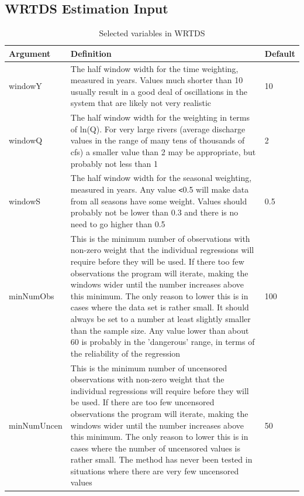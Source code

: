 \documentclass[a4paper,11pt]{article}\usepackage[]{graphicx}\usepackage[]{color}
\begin{document}
\subsection{WRTDS Estimation Input}
\label{sec:wrtdsInputVariables}
\begin{table}[ht]
\caption{Selected variables in WRTDS  \label{tab:WRTDS}}
\begin{tabularx}{\textwidth}{lXl}
\hline
  \textbf{Argument} & \textbf{Definition} & \textbf{Default} \\
\hline
windowY & The half window width for the time weighting, measured in years.  Values much shorter than 10 usually result in a good deal of oscillations in the system that are likely not very realistic & 10\\
windowQ & The half window width for the weighting in terms of ln(Q).  For very large rivers (average discharge values in the range of many tens of thousands of cfs) a smaller value than 2 may be appropriate, but probably not less than 1 & 2 \\
windowS & The half window width for the seasonal weighting, measured in years.  Any value \texttt{<}0.5 will make data from all seasons have some weight.  Values should probably not be lower than 0.3 and there is no need to go higher than 0.5 & 0.5 \\
minNumObs & This is the minimum number of observations with non-zero weight that the individual regressions will require before they will be used.  If there too few observations the program will iterate, making the windows wider until the number increases above this minimum.  The only reason to lower this is in cases where the data set is rather small.  It should always be set to a number at least slightly smaller than the sample size.  Any value lower than about 60 is probably in the 'dangerous' range, in terms of the reliability of the regression & 100 \\ 
minNumUncen & This is the minimum number of uncensored observations with non-zero weight that the individual regressions will require before they will be used.  If there are too few uncensored observations the program will iterate, making the windows wider until the number increases above this minimum.  The only reason to lower this is in cases where the number of uncensored values is rather small.  The method has never been tested in situations where there are very few uncensored values & 50 \\
\hline
\end{tabularx}

\end{table}
\end{document}
